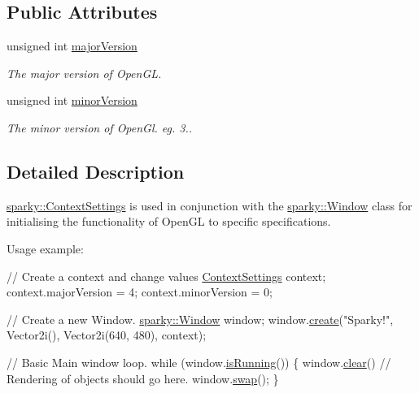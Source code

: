 \subsection*{Public Attributes}
\begin{DoxyCompactItemize}
\item 
unsigned int \hyperlink{structsparky_1_1_context_settings_a50930130c715417f92b072fb6fb41c80}{major\+Version}\hypertarget{structsparky_1_1_context_settings_a50930130c715417f92b072fb6fb41c80}{}\label{structsparky_1_1_context_settings_a50930130c715417f92b072fb6fb41c80}

\begin{DoxyCompactList}\small\item\em The major version of Open\+GL. \end{DoxyCompactList}\item 
unsigned int \hyperlink{structsparky_1_1_context_settings_a4881a797d7349fb27df94de114ef9e8e}{minor\+Version}\hypertarget{structsparky_1_1_context_settings_a4881a797d7349fb27df94de114ef9e8e}{}\label{structsparky_1_1_context_settings_a4881a797d7349fb27df94de114ef9e8e}

\begin{DoxyCompactList}\small\item\em The minor version of Open\+Gl. eg. 3.. \end{DoxyCompactList}\end{DoxyCompactItemize}


\subsection{Detailed Description}
\hyperlink{structsparky_1_1_context_settings}{sparky\+::\+Context\+Settings} is used in conjunction with the \hyperlink{classsparky_1_1_window}{sparky\+::\+Window} class for initialising the functionality of Open\+GL to specific specifications.

Usage example\+: 
\begin{DoxyCode}
\textcolor{comment}{// Create a context and change values}
\hyperlink{structsparky_1_1_context_settings_af177c704b49dee968972514d4da4998a}{ContextSettings} context;
context.majorVersion = 4;
context.minorVersion = 0;

\textcolor{comment}{// Create a new Window.}
\hyperlink{classsparky_1_1_window}{sparky::Window} window;
window.\hyperlink{classsparky_1_1_window_a146a77df577c6ca3e441a3c7f9bc2cbd}{create}(\textcolor{stringliteral}{"Sparky!"}, Vector2i(), Vector2i(640, 480), context);

\textcolor{comment}{// Basic Main window loop.}
\textcolor{keywordflow}{while} (window.\hyperlink{classsparky_1_1_window_a3ed4cf733081b4bbc147b5d5808adaac}{isRunning}())
\{
    window.\hyperlink{classsparky_1_1_window_a92cf43e19d310fea158098d8eb01c590}{clear}()
    \textcolor{comment}{// Rendering of objects should go here.}
    window.\hyperlink{classsparky_1_1_window_a155728f06dbc5742250649e3ec8fc779}{swap}();
\}
\end{DoxyCode}
 

